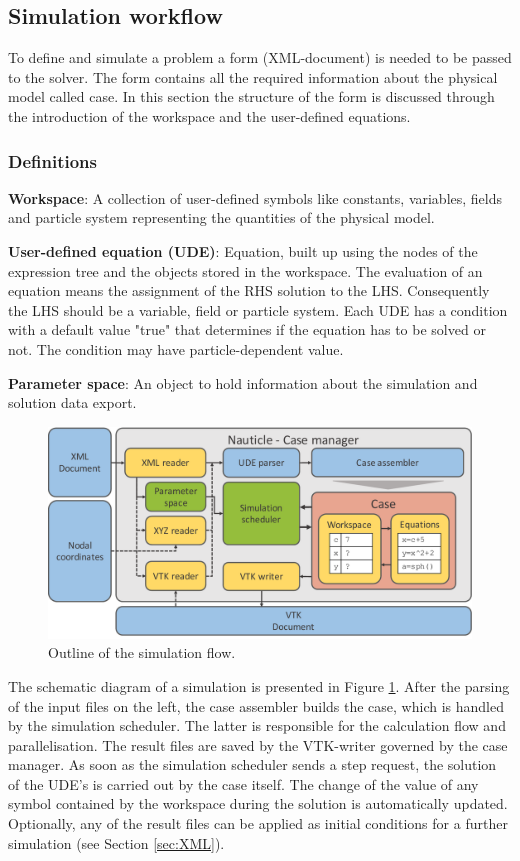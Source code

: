 \documentclass[a4paper,12pt,openany]{book}
\theoremstyle{break}
\begin{document}
\subsection{Simulation workflow} \label{sec:sim_workflow}
To define and simulate a problem a form (XML-document) is needed to be passed to the solver. The form contains all the required information about the physical model called case. In this section the structure of the form is discussed through the introduction of the workspace and the user-defined equations.
\subsubsection{Definitions}
\textbf{Workspace}: A collection of user-defined symbols like constants, variables, fields and particle system representing the quantities of the physical model.

\textbf{User-defined equation (UDE)}: Equation, built up using the nodes of the expression tree and the objects stored in the workspace. The evaluation of an equation means the assignment of the RHS solution to the LHS. Consequently the LHS should be a variable, field or particle system. Each UDE has a condition with a default value "true" that determines if the equation has to be solved or not. The condition may have particle-dependent value.

\textbf{Parameter space}: An object to hold information about the simulation and solution data export.

\begin{figure}[H]
  \includegraphics[scale=0.55]{workflow.pdf}
  \centering
  \caption{Outline of the simulation flow.}
  \label{fig:workflow}
\end{figure}

The schematic diagram of a simulation is presented in Figure \ref{fig:workflow}. After the parsing of the input files on the left, the case assembler builds the case, which is handled by the simulation scheduler. The latter is responsible for the calculation flow and parallelisation. The result files are saved by the VTK-writer governed by the case manager. 
As soon as the simulation scheduler sends a step request, the solution of the UDE's is carried out by the case itself. The change of the value of any symbol contained by the workspace during the solution is automatically updated. Optionally, any of the result files can be applied as initial conditions for a further simulation (see Section \ref{sec:XML}).
\end{document}
